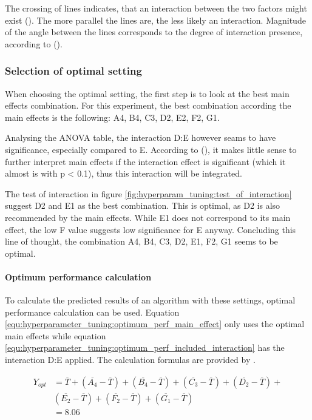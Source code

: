 The crossing of lines indicates, that an interaction between the two factors might exist (\cite{field_discovering_2012}). The more parallel the lines are, the less likely an interaction. Magnitude of the angle between the lines corresponds to the degree of interaction presence, according to (\cite{roy_primer_1990}).

\subsubsection{Selection of optimal setting}
When choosing the optimal setting, the first step is to look at the best main effects combination. For this experiment, the best combination according the main effects is the following: A4, B4, C3, D2, E2, F2, G1.

Analysing the ANOVA table, the interaction D:E however seams to have significance, especially compared to E. According to (\cite{field_discovering_2012}), it makes little sense to further interpret main effects if the interaction effect is significant (which it almost is with p < 0.1), thus this interaction will be integrated.

The test of interaction in figure \ref{fig:hyperparam_tuning:test_of_interaction} suggest D2 and E1 as the best combination. This is optimal, as D2 is also recommended by the main effects. While E1 does not correspond to its main effect, the low F value suggests low significance for E anyway. Concluding this line of thought, the combination A4, B4, C3, D2, E1, F2, G1 seems to be optimal.

\paragraph{Optimum performance calculation}
\label{sect:hyperparameter_tuning:optimum_perf_caluclation}
To calculate the predicted results of an algorithm with these settings, optimal performance calculation can be used. Equation \ref{equ:hyperparameter_tuning:optimum_perf_main_effect} only uses the optimal main effects while equation \ref{equ:hyperparameter_tuning:optimum_perf_included_interaction} has the interaction D:E applied. The calculation formulas are provided by \cite{roy_primer_1990}.

\begin{equation} \label{equ:hyperparameter_tuning:optimum_perf_main_effect}
	\begin{split}
		Y_{opt} &= \overline{T} + (\overline{A_4} - \overline{T}) + (\overline{B_4} - \overline{T}) + (\overline{C_3} - \overline{T}) + (\overline{D_2} - \overline{T}) + \\& (\overline{E_2} - \overline{T}) + (\overline{F_2} - \overline{T}) + (\overline{G_1} - \overline{T}) \\
			&= 8.06
	\end{split}
\end{equation}


